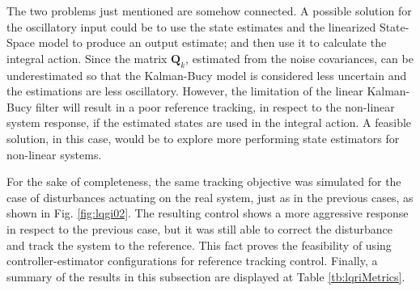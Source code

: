 \documentclass[a4paper,11pt]{book}
\numberwithin{figure}{chapter}
\numberwithin{equation}{chapter}
\numberwithin{table}{chapter}
\theoremstyle{definition}
\begin{document}
The two problems just mentioned are somehow connected. A possible solution for the oscillatory input could be to use the state estimates and the linearized State-Space model to produce an output estimate; and then use it to calculate the integral action. Since the matrix $\bm{Q}_k$, estimated from the noise covariances, can be underestimated so that the Kalman-Bucy model is considered less uncertain and the estimations are less oscillatory. However, the limitation of the linear Kalman-Bucy filter will result in a poor reference tracking, in respect to the non-linear system response, if the estimated states are used in the integral action. A feasible solution, in this case, would be to explore more performing state estimators for non-linear systems.

For the sake of completeness, the same tracking objective was simulated for the case of disturbances actuating on the real system, just as in the previous cases, as shown in Fig. \ref{fig:lqgi02}. The resulting control shows a more aggressive response in respect to the previous case, but it was still able to correct the disturbance and track the system to the reference. This fact proves the feasibility of using controller-estimator configurations for reference tracking control. Finally, a summary of the results in this subsection are displayed at Table \ref{tb:lqriMetrics}.
\end{document}
